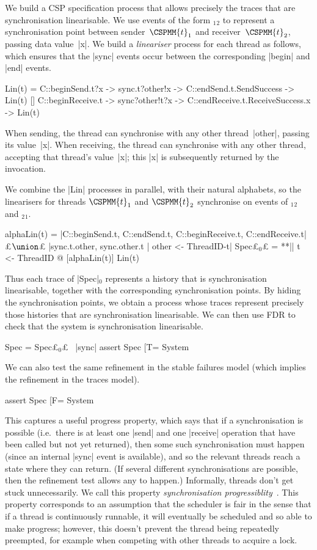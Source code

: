 We build a CSP specification process that allows precisely the traces that are
synchronisation linearisable.  We use events of the form
$_1$$_2$ to represent a synchronisation point
between sender~$\CSPMM{t}_1$ and receiver~$\CSPMM{t}_2$, passing data
value~|x|.  We build a \emph{lineariser} process for each thread as follows,
which ensures that the |sync| events occur between the corresponding |begin|
and |end| events.
%
\begin{cspm}
Lin(t) = 
  C::beginSend.t?x -> sync.t?other!x -> C::endSend.t.SendSuccess -> Lin(t)
  [] C::beginReceive.t -> sync?other!t?x -> C::endReceive.t.ReceiveSuccess.x -> Lin(t)
\end{cspm}
%
When sending, the thread can synchronise with any other thread~|other|,
passing its value~|x|.  When receiving, the thread can synchronise with any
other thread, accepting that thread's value~|x|; this |x| is subsequently
returned by the invocation.

We combine the |Lin| processes in parallel, with their natural
alphabets, so the linearisers for threads $\CSPMM{t}_1$ and $\CSPMM{t}_2$
synchronise on events of $_1$$_2$ and
$_2$$_1$.  
%
\begin{cspm}
alphaLin(t) =
  {|C::beginSend.t, C::endSend.t, C::beginReceive.t, C::endReceive.t|} £$\union$£
  {|sync.t.other, sync.other.t | other <- ThreadID-{t}|}
Spec£$_0$£ = **|| t <- ThreadID @ [alphaLin(t)] Lin(t)
\end{cspm} %
%
Thus each trace of |Spec|$_0$ represents a history that is synchronisation
linearisable, together with the corresponding synchronisation points.  By
hiding the synchronisation points, we obtain a process whose traces represent
precisely those histories that are synchronisation linearisable.  We can then
use FDR to check that the system is synchronisation linearisable. 
%
\begin{cspm}
Spec = Spec£$_0$£ \ {|sync|}
assert Spec [T= System
\end{cspm}

We can also test the same refinement in the stable failures model (which
implies the refinement in the traces model).
%
\begin{cspm}
assert Spec [F= System
\end{cspm}
%
This captures a useful progress property, which says that if a synchronisation
is possible (i.e.~there is at least one |send| and one |receive| operation
that have been called but not yet returned), then some such synchronisation
must happen (since an internal |sync| event is available), and so the relevant
threads reach a state where they can return.  (If several different
synchronisations are possible, then the refinement test allows any to happen.)
Informally, threads don't get stuck unnecessarily.  We call this property
\emph{synchronisation progressiblity}~\cite{LL:synchronisation}.  This
property corresponds to an assumption that the scheduler is fair in the sense
that if a thread is continuously runnable, it will eventually be scheduled and
so able to make progress; however, this doesn't prevent the thread being
repeatedly preempted, for example when competing with other threads to acquire
a lock. 

